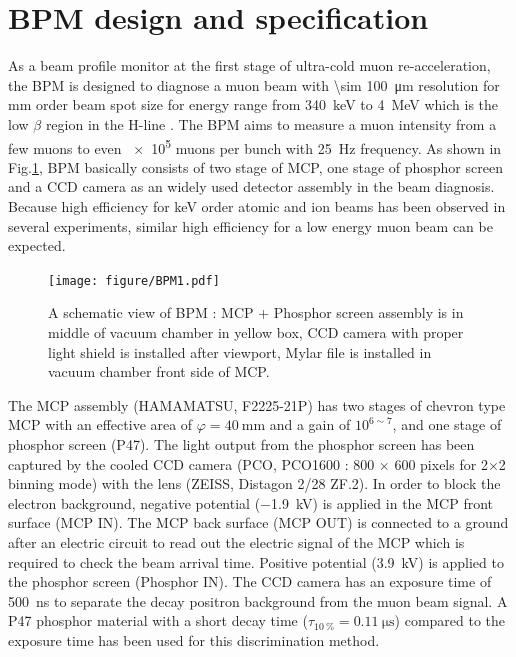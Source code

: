 \documentclass[preprint,3p,twocolumn]{elsarticle}
\begin{document}
\section{BPM design and specification}

As a beam profile monitor at the first stage of ultra-cold muon re-acceleration, the BPM is designed to diagnose a muon beam with \SI{\sim 100}{\micro\metre} resolution for mm order beam spot size for energy range from \SI{340}{\keV} to \SI{4}{\MeV} which is the low $\beta$ region in the H-line \cite{E34}.
The BPM aims to measure a muon intensity from a few muons to even \num{e5} muons per bunch with \SI{25}{\hertz} frequency.
As shown in Fig.\ref{fig:BPM_scheme}, BPM basically consists of two stage of MCP, one stage of phosphor screen and a CCD camera as an widely used detector assembly in the beam diagnosis. %
Because high efficiency for \si{\keV} order atomic and ion beams has been observed in several experiments\cite{MCP_efficiency, MCP_efficiency1}, similar high efficiency for a low energy muon beam can be expected. 

\begin{figure}[htb]
\begin{minipage}[t]{65mm}
\texttt{[image: figure/BPM1.pdf]}
\end{minipage}
\vspace{-0.6cm}
\caption{A schematic view of BPM : MCP + Phosphor screen assembly is in middle of vacuum chamber in yellow box, CCD camera with proper light shield is installed after viewport, Mylar file is installed in vacuum chamber front side of MCP. }
\label{fig:BPM_scheme}
\end{figure}

The MCP assembly (HAMAMATSU, F2225-21P) has two stages of chevron type MCP with an effective area of $\varphi=\SI{40}{\mm}$ and a gain of $10^{6\sim7}$, and one stage of phosphor screen (P47). The light output from the phosphor screen has been captured by the cooled CCD camera (PCO, PCO1600 : 800 $\times$ 600 pixels for 2$\times$2 binning mode) with the lens (ZEISS, Distagon 2/28 ZF.2). 
In order to block the electron background, negative potential (\SI{-1.9}{\kilo\volt}) is applied in the MCP front surface (MCP IN).
The MCP back surface (MCP OUT) is connected to a ground after an electric circuit to read out the electric signal of the MCP which is required to check the beam arrival time.
Positive potential (\SI{3.9}{\kilo\volt}) is applied to the phosphor screen (Phosphor IN).
The CCD camera has an exposure time of \SI{500}{\nano\s} to separate the decay positron background from the muon beam signal.
A P47 phosphor material with a short decay time ($\tau_{\SI{10}{\percent}}=\SI{0.11}{\micro\s}$) compared to the exposure time has been used for this discrimination method.
\end{document}

